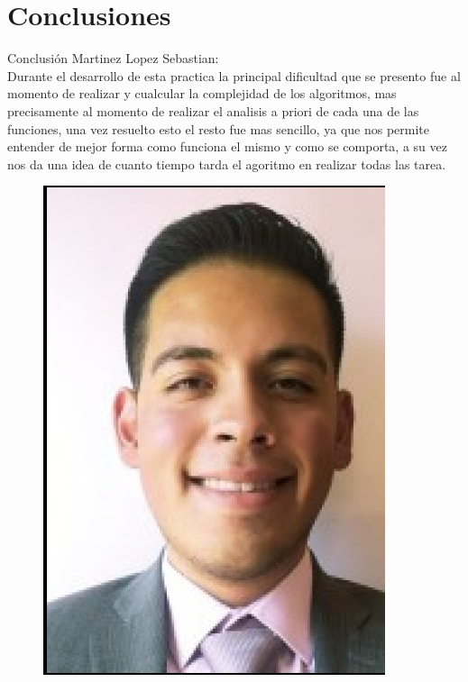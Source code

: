 \documentclass[12pt,twoside]{article}
\begin{document}
\clearpage

\section{Conclusiones}
Conclusión Martinez Lopez Sebastian:\\
Durante el desarrollo de esta practica la principal dificultad que se presento fue al momento de realizar y cualcular la complejidad de los algoritmos, mas precisamente al momento de realizar el analisis a priori de cada una de las funciones, una vez resuelto esto el resto fue mas sencillo, ya que nos permite entender de mejor forma como funciona el mismo y como se comporta, a su vez nos da una idea de cuanto tiempo tarda el agoritmo en realizar todas las tarea.
 
\begin{figure}[h!]
\centering
\includegraphics[scale=0.3]{seb1.jpg}
\label{fig:universe}
\end{figure}
\\
\end{document}
